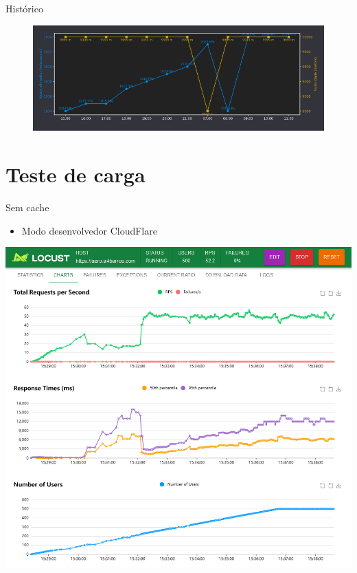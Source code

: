 \documentclass{beamer}
\begin{document}
\begin{frame}{Histórico}
    \begin{figure}[ht]
        \begin{center}
        \includegraphics[width=0.7\linewidth]{img/history-2.png}
        \label{fig:UI}
        \end{center}
    \end{figure}
\end{frame}


\section{Teste de carga}

\begin{frame}{Sem cache}
    \begin{itemize}
        \item Modo desenvolvedor CloudFlare
    \end{itemize}    

    \begin{center}
        \includegraphics[width=0.6\linewidth]{img/locust-no-cache.png}
    \end{center}
\end{frame}
\end{document}
